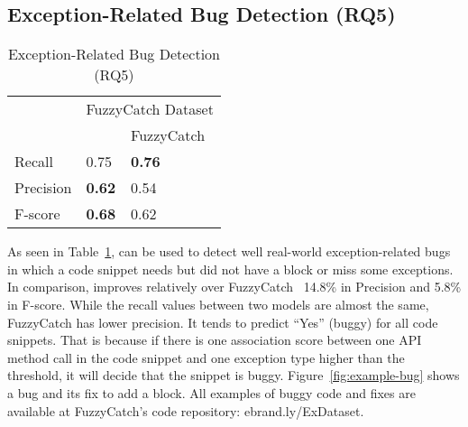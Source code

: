 \subsection{Exception-Related Bug Detection (RQ5)}
\label{sec:rq1}

\begin{table}[t]%
  \caption {Exception-Related Bug Detection (RQ5)}
  \vspace{-12pt}
  \small
	\begin{center}
		\renewcommand{\arraystretch}{1}
		\begin{tabular}{|p{1.75cm}<{\centering}|p{1.75cm}<{\centering}|p{1.75cm}<{\centering}|}
		  \hline
			\multirow{2}{*}{} & \multicolumn{2}{c|}{FuzzyCatch Dataset} \\
			\cline{2-3}
			  & \tool  & FuzzyCatch~\cite{xrank-fse20} \\
			\hline
			Recall    & 0.75 & \textbf{0.76}\\
			Precision & \textbf{0.62} & 0.54\\
			F-score   & \textbf{0.68} & 0.62\\
			\hline
		\end{tabular}
		\label{tab:bug}
	\end{center}
\end{table}



As seen in Table~\ref{tab:bug}, {\tool} can be used to detect well
real-world exception-related bugs in which a code snippet needs but
did not have a  block or miss some exceptions. In
comparison, {\tool} improves relatively over
FuzzyCatch~\cite{xrank-fse20} 14.8\% in Precision and
5.8\% in F-score.
While the recall values between two models are almost the same,
FuzzyCatch has lower precision. It tends to predict ``Yes'' (buggy)
for all code snippets. That is because if there is one association
score between one API method call in the code snippet and one
exception type higher than the threshold, it will decide that the
snippet is buggy. Figure~\ref{fig:example-bug} shows a bug and its fix
to add a  block. All examples of buggy code and fixes
are available at FuzzyCatch's code repository: ebrand.ly/ExDataset.





